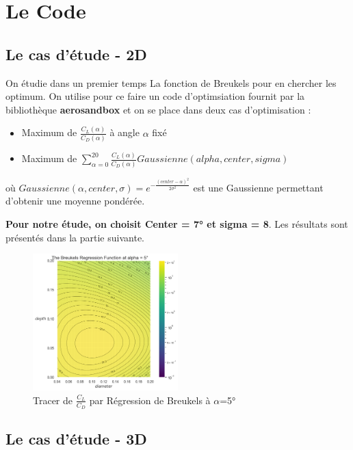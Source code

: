 \documentclass[conference]{IEEEtran}
\begin{document}
\section{Le Code }

\subsection{Le cas d'étude - 2D} 

On étudie dans un premier temps La fonction de Breukels pour en chercher les optimum. On utilise pour ce faire un code d'optimsiation fournit par la bibliothèque \textbf{aerosandbox} et on se place dans deux cas d'optimisation : 
\begin{itemize}
    \item Maximum de $\frac{C_L(\alpha)}{C_D(\alpha)}$ à angle $\alpha$ fixé 
    \item Maximum de $\sum_{\alpha = 0}^{20}\frac{C_L(\alpha)}{C_D(\alpha)} Gaussienne(alpha, center, sigma) $
\end{itemize}

    où $Gaussienne(\alpha, center, \sigma) = e^{-\frac{(center - \alpha)^2}{2\sigma^2}}$ est une Gaussienne permettant d'obtenir une moyenne pondérée. 

\textbf{Pour notre étude, on choisit Center = 7° et sigma = 8}. Les résultats sont présentés dans la partie suivante.
\begin{figure}[H]
    \centering
    \includegraphics[width=0.5\textwidth]{Pics/breukels.png}  
    \caption{Tracer de $\frac{C_L}{C_D}$ par Régression de Breukels à $\alpha$=5°}
    \label{fig:breukels}
\end{figure}


\subsection{Le cas d'étude - 3D} 
\end{document}
